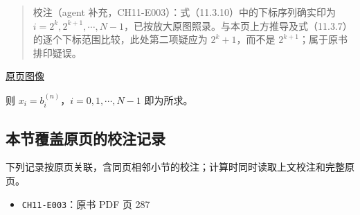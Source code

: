 \documentclass[
  10pt,
  fontset=fandol]{ctexart}
\providecommand{\tightlist}{%
  \setlength{\itemsep}{0pt}\setlength{\parskip}{0pt}}
\begin{document}
\begin{quote}
校注（agent 补充，CH11-E003）：式（11.3.10）中的下标序列确实印为 \(i=2^k,2^{k+1},\cdots,N-1\)，已按放大原图照录。与本页上方推导及式（11.3.7）的逐个下标范围比较，此处第二项疑应为 \(2^k+1\)，而不是 \(2^{k+1}\)；属于原书排印疑误。
\end{quote}

\href{../../source-images/pdf-288.jpeg}{原页图像}

则 \(x_i=b_i^{(n)}\)，\(i=0,1,\cdots,N-1\) 即为所求。

\subsection{本节覆盖原页的校注记录}\label{ux672cux8282ux8986ux76d6ux539fux9875ux7684ux6821ux6ce8ux8bb0ux5f55}

下列记录按原页关联，含同页相邻小节的校注；计算时同时读取上文校注和完整原页。

\begin{itemize}
\tightlist
\item
  \texttt{CH11-E003}：原书 PDF 页 287
\end{itemize}
\end{document}
